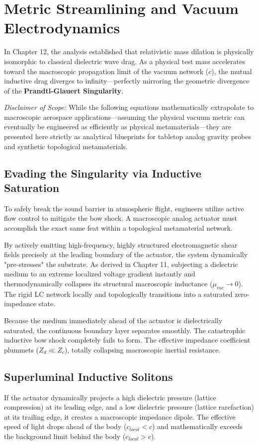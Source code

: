 \section{Metric Streamlining and Vacuum Electrodynamics}
In Chapter 12, the analysis established that relativistic mass dilation is physically isomorphic to classical dielectric wave drag. As a physical test mass accelerates toward the macroscopic propagation limit of the vacuum network ($c$), the mutual inductive drag diverges to infinity---perfectly mirroring the geometric divergence of the \textbf{Prandtl-Glauert Singularity}.

\textit{Disclaimer of Scope:} While the following equations mathematically extrapolate to macroscopic aerospace applications---assuming the physical vacuum metric can eventually be engineered as efficiently as physical metamaterials---they are presented here strictly as analytical blueprints for tabletop analog gravity probes and synthetic topological metamaterials.

\subsection{Evading the Singularity via Inductive Saturation}
To safely break the sound barrier in atmospheric flight, engineers utilize active flow control to mitigate the bow shock. A macroscopic analog actuator must accomplish the exact same feat within a topological metamaterial network. 

By actively emitting high-frequency, highly structured electromagnetic shear fields precisely at the leading boundary of the actuator, the system dynamically "pre-stresses" the substrate. As derived in Chapter 11, subjecting a dielectric medium to an extreme localized voltage gradient instantly and thermodynamically collapses its structural macroscopic inductance ($\mu_{vac} \to 0$). The rigid LC network locally and topologically transitions into a saturated zero-impedance state.

Because the medium immediately ahead of the actuator is dielectrically saturated, the continuous boundary layer separates smoothly. The catastrophic inductive bow shock completely fails to form. The effective impedance coefficient plummets ($Z_d \ll Z_c$), totally collapsing macroscopic inertial resistance. 

\subsection{Superluminal Inductive Solitons}
If the actuator dynamically projects a high dielectric pressure (lattice compression) at its leading edge, and a low dielectric pressure (lattice rarefaction) at its trailing edge, it creates a macroscopic impedance dipole. The effective speed of light drops ahead of the body ($c_{local} < c$) and mathematically exceeds the background limit behind the body ($c_{local} > c$).

